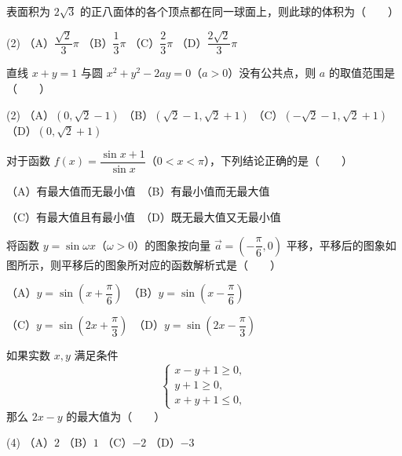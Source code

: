 \begin{question}
表面积为 $2\sqrt3$ 的正八面体的各个顶点都在同一球面上，则此球的体积为\mbox{（　　）}

\begin{gkopts}(2)
\task （A）$\dfrac{\sqrt2}{3}\pi$
\task （B）$\dfrac13\pi$
\task （C）$\dfrac23\pi$
\task （D）$\dfrac{2\sqrt2}{3}\pi$
\end{gkopts}

\end{question}
\begin{question}
直线 $x+y=1$ 与圆 $x^2+y^2-2ay=0$（$a>0$）没有公共点，则 $a$ 的取值范围是\mbox{（　　）}

\begin{gkopts}(2)
\task （A）$(0,\sqrt2-1)$
\task （B）$(\sqrt2-1,\sqrt2+1)$
\task （C）$(-\sqrt2-1,\sqrt2+1)$
\task （D）$(0,\sqrt2+1)$
\end{gkopts}

\end{question}
\begin{question}
对于函数 $f(x)=\dfrac{\sin x+1}{\sin x}$（$0<x<\pi$），下列结论正确的是\mbox{（　　）}

（A）有最大值而无最小值　（B）有最小值而无最大值

（C）有最大值且有最小值　（D）既无最大值又无最小值

\Needspace{0.4\textheight}
\end{question}
\begin{question}
将函数 $y=\sin\omega x$（$\omega>0$）的图象按向量 $\vec a=\left(-\dfrac\pi6,0\right)$ 平移，平移后的图象如图所示，则平移后的图象所对应的函数解析式是\mbox{（　　）}

（A）$y=\sin\left(x+\dfrac\pi6\right)$　（B）$y=\sin\left(x-\dfrac\pi6\right)$

（C）$y=\sin\left(2x+\dfrac\pi3\right)$　（D）$y=\sin\left(2x-\dfrac\pi3\right)$
\nopagebreak[4]
\begin{center}\end{center}
\nopagebreak[4]
\end{question}
\begin{question}
如果实数 $x,y$ 满足条件
\nopagebreak[4]
\[
\begin{cases}
x-y+1\geqslant0,\\
y+1\geqslant0,\\
x+y+1\leqslant0,
\end{cases}
\]
那么 $2x-y$ 的最大值为\mbox{（　　）}

\begin{gkopts}(4)
\task （A）$2$
\task （B）$1$
\task （C）$-2$
\task （D）$-3$
\end{gkopts}

\end{question}
